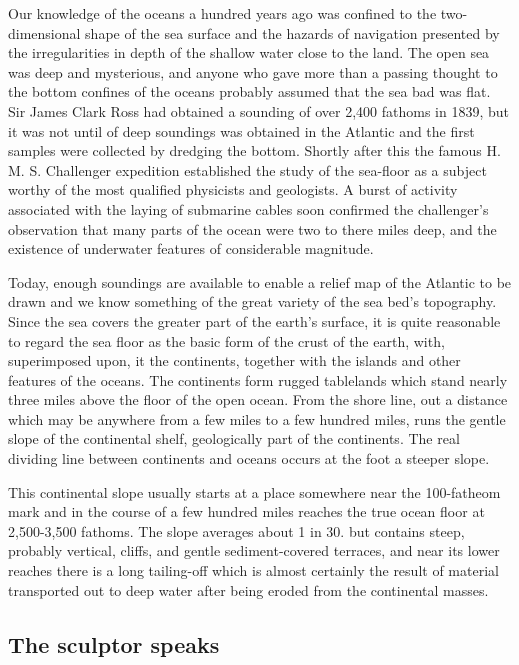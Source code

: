 \documentclass[11pt]{article}
\begin{document}
Our knowledge of the oceans a hundred years ago was confined to the two-dimensional shape of the sea surface and the hazards of navigation presented by the irregularities in depth of the shallow water close to the land. The open sea was deep and mysterious, and anyone who gave more than a passing thought to the bottom confines of the oceans probably assumed that the sea bad was flat. Sir James Clark Ross had obtained a sounding of over 2,400 fathoms in 1839, but it was not until of deep soundings was obtained in the Atlantic and the first samples were collected by dredging the bottom. Shortly after this the famous H. M. S. Challenger expedition established the study of the sea-floor as a subject worthy of the most qualified physicists and geologists. A burst of activity associated with the laying of submarine cables soon confirmed the challenger's observation that many parts of the ocean were two to there miles deep, and the existence of underwater features of considerable magnitude.

Today, enough soundings are available to enable a relief map of the Atlantic to be drawn and we know something of the great variety of the sea bed's topography. Since the sea covers the greater part of the earth's surface, it is quite reasonable to regard the sea floor as the basic form of the crust of the earth, with, superimposed upon, it the continents, together with the islands and other features of the oceans. The continents form rugged tablelands which stand nearly three miles above the floor of the open ocean. From the shore line, out a distance which may be anywhere from a few miles to a few hundred miles, runs the gentle slope of the continental shelf, geologically part of the continents. The real dividing line between continents and oceans occurs at the foot a steeper slope.

This continental slope usually starts at a place somewhere near the 100-fatheom mark and in the course of a few hundred miles reaches the true ocean floor at 2,500-3,500 fathoms. The slope averages about 1 in 30. but contains steep, probably vertical, cliffs, and gentle sediment-covered terraces, and near its lower reaches there is a long tailing-off which is almost certainly the result of material transported out to deep water after being eroded from the continental masses.
\subsection{The sculptor speaks}
\label{sec-2-31}
\end{document}
